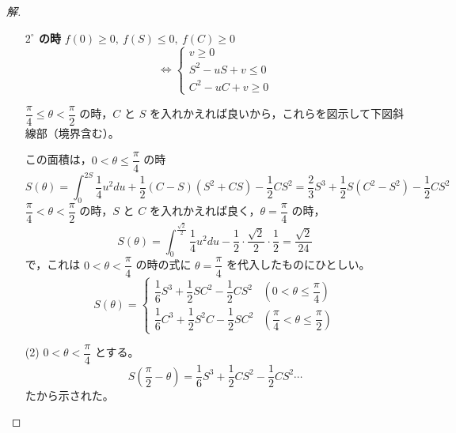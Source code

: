 \documentclass[../main.tex]{subfiles}
\begin{document}
\begin{proof}[解]
\begin{enumerate}
      \textbf{$2^\circ$ の時} \quad $f(0)\ge0,\ f(S)\le0,\ f(C)\ge0$
      \[
        \iff
        \begin{cases}
          v\ge0 \\
          S^2-uS+v\le0 \\
          C^2-uC+v\ge0
        \end{cases}
      \]

      $\dfrac{\pi}{4}\le\theta<\dfrac{\pi}{2}$ の時，$C$ と $S$ を入れかえれば良いから，これらを図示して下図斜線部（境界含む）。

      \begin{center}
      \end{center}

      この面積は，$0<\theta\le\dfrac{\pi}{4}$ の時
      \[
        S(\theta) = \int_0^{2S}\frac{1}{4}u^2du + \frac{1}{2}(C-S)(S^2+CS)-\frac{1}{2}CS^2 = \frac{2}{3}S^3+\frac{1}{2}S(C^2-S^2)-\frac{1}{2}CS^2
      \]
      $\dfrac{\pi}{4}<\theta<\dfrac{\pi}{2}$ の時，$S$ と $C$ を入れかえれば良く，$\theta=\dfrac{\pi}{4}$ の時，
      \[
        S(\theta)=\int_0^{\frac{\sqrt2}{2}}\frac{1}{4}u^2du - \frac{1}{2}\cdot\frac{\sqrt2}{2}\cdot\frac{1}{2}=\frac{\sqrt2}{24}
      \]
      で，これは $0<\theta<\dfrac{\pi}{4}$ の時の式に $\theta=\dfrac{\pi}{4}$ を代入したものにひとしい。
      \[
        S(\theta)=
        \begin{cases}
          \dfrac{1}{6}S^3+\dfrac{1}{2}SC^2-\dfrac{1}{2}CS^2 & \left(0<\theta\le\dfrac{\pi}{4}\right) \\[2mm]
          \dfrac{1}{6}C^3+\dfrac{1}{2}S^2C-\dfrac{1}{2}SC^2 & \left(\dfrac{\pi}{4}<\theta\le\dfrac{\pi}{2}\right)
        \end{cases}
      \]

    \item[(2)] $0<\theta<\dfrac{\pi}{4}$ とする。
      \[
        S\left(\frac{\pi}{2}-\theta\right) = \frac{1}{6}S^3+\frac{1}{2}CS^2-\frac{1}{2}CS^2 \cdots
      \]
      たから示された。
  \end{enumerate}
\end{proof}
\end{document}
